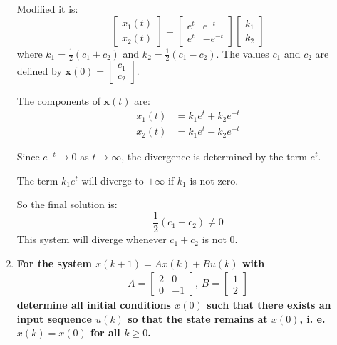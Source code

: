 \documentclass[10pt]{article}
\begin{document}
\begin{enumerate}
		Modified it is:
		$$
		\begin{bmatrix} x_1(t) \\ x_2(t) \end{bmatrix} = \begin{bmatrix} e^t & e^{-t} \\ e^t & -e^{-t} \end{bmatrix} \begin{bmatrix} k_1 \\ k_2 \end{bmatrix}
		$$
		where $k_1 = \frac{1}{2}(c_1+c_2)$ and $k_2=\frac{1}{2}(c_1-c_2)$. The values $c_1$ and $c_2$ are defined by $\mathbf{x}(0) = \begin{bmatrix} c_1 \\ c_2 \end{bmatrix}$.
		
		The components of $\mathbf{x}(t)$ are:
		\begin{align*}
			x_1(t) &= k_1 e^t + k_2 e^{-t} \\
			x_2(t) &= k_1 e^t - k_2 e^{-t}
		\end{align*}
		
		Since $e^{-t} \rightarrow 0$ as $t \rightarrow \infty$, the divergence is determined by the term $e^t$. 
		
		The term $k_1 e^t$ will diverge to $\pm\infty$ if $k_1$ is not zero. 
		
		So the final solution is:
		$$ \frac{1}{2}(c_1+c_2) \neq 0 $$
		This system will diverge whenever $c_1+c_2$ is not $0$.
		
		\item \textbf{For the system $x(k+1) = Ax(k) + Bu(k)$ with 
			\begin{eqnarray*}
				A=\begin{bmatrix}
					2 & 0\\
					0 & -1
				\end{bmatrix},\,
				B=\begin{bmatrix}
					1\\
					2
				\end{bmatrix}
			\end{eqnarray*}
			determine all initial conditions $x(0)$ such that there exists an input sequence $u(k)$ so that the state remains  at $x(0)$, i. e. $x(k) = x(0)$ for all $k \geq 0$.}
		

\end{enumerate}
\end{document}
